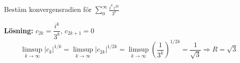 \begin{example}
Bestäm konvergensradien för $\displaystyle\sum_0^\infty \frac{i^k z^{2k}}{3^k}$

\textbf{Lösning:} $c_{2k} = \dfrac{i^k}{3^k}$, $c_{2k+1} = 0$ \quad \textcolor{magenta!80!black}{}
\[ \limsup_{k \to \infty} |c_k|^{1/k} = \limsup_{k \to \infty} |c_{2k}|^{1/2k} = \limsup_{k \to \infty} \left( \frac{1}{3^k} \right)^{1/2k} = \frac{1}{\sqrt{3}} \Longrightarrow R = \sqrt{3} \]
\end{example}
